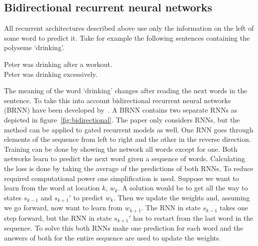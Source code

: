 \subsection{Bidirectional recurrent neural networks}
\label{subsec:bidirectional}
All recurrent architectures described above use only the information on the left of some word to predict it.
Take for example the following sentences containing the polyseme `drinking'.
\begin{center}
    Peter was drinking after a workout.\\[3mm]
    Peter was drinking excessively.
\end{center}
The meaning of the word `drinking' changes after reading the next words in the sentence.
To take this into account bidirectional recurrent neural networks (BRNN) have been developed by~\citet{schuster1997}.
A BRNN contains two separate RNNs as depicted in figure~\ref{fig:bidirectional}.
The paper only considers RNNs, but the method can be applied to gated recurrent models as well.
One RNN goes through elements of the sequence from left to right and the other in the reverse direction.
Training can be done by showing the network all words except for one.
Both networks learn to predict the next word given a sequence of words.
Calculating the loss is done by taking the average of the predictions of both RNNs.
To reduce required computational power one simplification is used.
Suppose we want to learn from the word at location $k$, $w_k$.
A solution would be to get all the way to states $s_{k-1}$ and $s_{k+1}'$ to predict $w_k$.
Then we update the weights and, assuming we go forward, now want to learn from $w_{k+1}$.
The RNN in state $s_{k-1}$ takes one step forward, but the RNN in state $s_{k+1}'$ has to restart from the last word in the sequence.
To solve this both RNNs make one prediction for each word and the answers of both for the entire sequence are used to update the weights.

